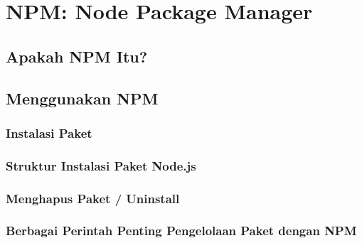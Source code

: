 \chapter{NPM: Node Package Manager}

\section{Apakah NPM Itu?}

\section{Menggunakan NPM}

\subsection{Instalasi Paket}

\subsection{Struktur Instalasi Paket Node.js}

\subsection{Menghapus Paket / Uninstall}

\subsection{Berbagai Perintah Penting Pengelolaan Paket dengan NPM}

